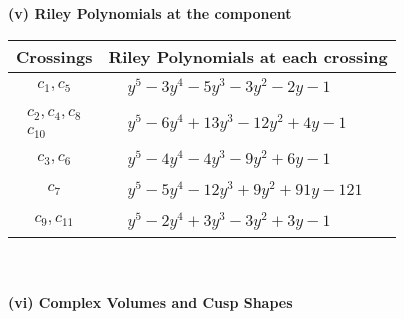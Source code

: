 \documentclass[1p]{elsarticle_modified}
\theoremstyle{definition}
\begin{document}
\newpage\renewcommand{\arraystretch}{1}
\flushleft \textbf{(v) Riley Polynomials at the component}\newline \\
\begin{tabular}{m{50pt}|m{274pt}}
Crossings & \hspace{64pt}Riley Polynomials at each crossing \\
\hline $$\begin{aligned}c_{1},c_{5}\end{aligned}$$&$\begin{aligned}
&y^5-3 y^4-5 y^3-3 y^2-2 y-1
\end{aligned}$\\
\hline $$\begin{aligned}c_{2},c_{4},c_{8}\\c_{10}\end{aligned}$$&$\begin{aligned}
&y^5-6 y^4+13 y^3-12 y^2+4 y-1
\end{aligned}$\\
\hline $$\begin{aligned}c_{3},c_{6}\end{aligned}$$&$\begin{aligned}
&y^5-4 y^4-4 y^3-9 y^2+6 y-1
\end{aligned}$\\
\hline $$\begin{aligned}c_{7}\end{aligned}$$&$\begin{aligned}
&y^5-5 y^4-12 y^3+9 y^2+91 y-121
\end{aligned}$\\
\hline $$\begin{aligned}c_{9},c_{11}\end{aligned}$$&$\begin{aligned}
&y^5-2 y^4+3 y^3-3 y^2+3 y-1
\end{aligned}$\\
\hline
\end{tabular}\\~\\
\newpage\flushleft \textbf{(vi) Complex Volumes and Cusp Shapes}
\end{document}
